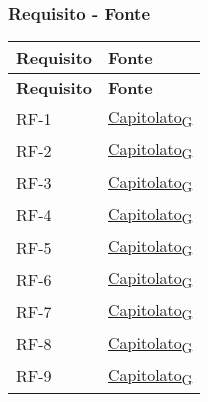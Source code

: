 \subsubsection{Requisito - Fonte}
\begin{longtable}{|>{\centering\arraybackslash}m{}|>{\centering\arraybackslash}m{}|}
	\hline
	\textbf{Requisito} & \textbf{Fonte}                 \\\hline
	\endfirsthead
	\hline
	\textbf{Requisito} & \textbf{Fonte}                 \\\hline
	\endhead
	RF-1               & \href{https://7last.github.io/docs/rtb/documentazione-interna/glossario\#capitolato}{Capitolato\textsubscript{G}}                     \\\hline
	RF-2               & \href{https://7last.github.io/docs/rtb/documentazione-interna/glossario\#capitolato}{Capitolato\textsubscript{G}}                     \\\hline
	RF-3               & \href{https://7last.github.io/docs/rtb/documentazione-interna/glossario\#capitolato}{Capitolato\textsubscript{G}}                     \\\hline
	RF-4               & \href{https://7last.github.io/docs/rtb/documentazione-interna/glossario\#capitolato}{Capitolato\textsubscript{G}}                     \\\hline
	RF-5               & \href{https://7last.github.io/docs/rtb/documentazione-interna/glossario\#capitolato}{Capitolato\textsubscript{G}}                     \\\hline
	RF-6               & \href{https://7last.github.io/docs/rtb/documentazione-interna/glossario\#capitolato}{Capitolato\textsubscript{G}}                     \\\hline
	RF-7               & \href{https://7last.github.io/docs/rtb/documentazione-interna/glossario\#capitolato}{Capitolato\textsubscript{G}}                     \\\hline
	RF-8               & \href{https://7last.github.io/docs/rtb/documentazione-interna/glossario\#capitolato}{Capitolato\textsubscript{G}}                     \\\hline
	RF-9               & \href{https://7last.github.io/docs/rtb/documentazione-interna/glossario\#capitolato}{Capitolato\textsubscript{G}}                     \\\hline

\end{longtable}
